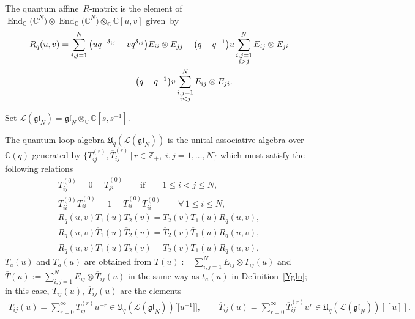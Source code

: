 \documentclass[11pt]{article}
\numberwithin{theorem}{section}
\numberwithin{proposition}{section}
\numberwithin{lemma}{section}
\numberwithin{corollary}{section}
\numberwithin{definition}{section}
\numberwithin{example}{section}
\numberwithin{remark}{section}
\numberwithin{note}{section}
\DeclareMathOperator{\End}{End}
\numberwithin{equation}{section}
\begin{document}
\begin{definition}
The quantum af\/f\/ine~$R$-matrix is the element of $\End_{\mathbb{C}}\big(\mathbb{C}^N\big) \otimes
\End_{\mathbb{C}}\big(\mathbb{C}^N\big) \otimes_{\mathbb{C}} \mathbb{C}[u,v]$ given~by
\begin{gather*}
R_q(u,v) = \sum\limits_{i,j=1}^N \big(uq^{-\delta_{ij}} - vq^{\delta_{ij}}\big) E_{ii} \otimes E_{jj} - \big(q-q^{-1}\big)u
\sum\limits_{\substack{i,j=1\\ i > j}}^N E_{ij} \otimes E_{ji}\\
\hphantom{R_q(u,v) =}{}
- \big(q-q^{-1}\big)v \sum\limits_{\substack{i,j=1\\ i < j}}^N E_{ij} \otimes E_{ji}.
\end{gather*}
\end{definition}
Set $\mathcal{L}(\mathfrak{gl}_N)=\mathfrak{gl}_N \otimes_{\mathbb{C}} \mathbb{C}[s,s^{-1}]$.
\begin{definition}
The quantum loop algebra $\mathfrak{U}_q(\mathcal{L}(\mathfrak{gl}_N))$ is the unital associative algebra
over~$\mathbb{C}(q)$ generated by $\{T_{ij}^{(r)},\overline{T}_{ij}^{(r)} \,|\, r\in\mathbb{Z}_+, \; i,j=1,\ldots,N\}$
which must satisfy the following relations
\begin{gather}
T_{ij}^{(0)} = 0 = \overline{T}_{ji}^{(0)} \qquad \text{if} \qquad  1 \leq i<j \leq N,
\nonumber
\\
T_{ii}^{(0)} \overline{T}_{ii}^{(0)} = 1 = \overline{T}_{ii}^{(0)} T_{ii}^{(0)} \qquad \forall\,   1 \leq i \leq N,
\nonumber
\\
R_q(u,v)T_1(u)T_2(v) = T_2(v) T_1(u) R_q(u,v),
\label{RTTql1}
\\
R_q(u,v)\overline{T}_1(u)\overline{T}_2(v) = \overline{T}_2(v) \overline{T}_1(u) R_q(u,v),
\label{RTTql2}
\\
R_q(u,v)\overline{T}_1(u) T_2(v) = T_2(v) \overline{T}_1(u) R_q(u,v),
\label{RTTql3}
\end{gather}
$T_a(u)$ and $\overline{T}_a(u)$ are obtained from $T(u):=\sum\limits_{i,j=1}^N{E_{ij} \otimes T_{ij}(u)}$ and
$\overline{T}(u):=\sum\limits_{i,j=1}^N{E_{ij} \otimes \overline{T}_{ij}(u)}$ in the same way as $t_a(u)$ in
Def\/inition~\ref{Ygln}; in this case, $T_{ij}(u)$, $\overline{T}_{ij}(u)$ are the elements
\begin{gather*}
T_{ij}(u)=\sum\limits_{r=0}^\infty{T_{ij}^{(r)}u^{-r}} \in
\mathfrak{U}_q(\mathcal{L}(\mathfrak{gl}_N))\big[\big[u^{-1}\big]\big],
\qquad
\overline{T}_{ij}(u)=\sum\limits_{r=0}^\infty{\overline{T}_{ij}^{(r)}u^{r}} \in
\mathfrak{U}_q(\mathcal{L}(\mathfrak{gl}_N))[[u]].
\end{gather*}
\end{definition}
\end{document}
